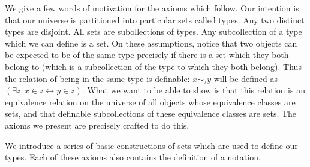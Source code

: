 \documentclass[12pt]{book}
\begin{document}
We give a few words of motivation for the axioms which follow.  Our intention is that our universe is partitioned into particular sets called types.  Any two distinct types are disjoint.  All sets are subollections of types.  Any subcollection of a type which we can define is a set.  On these assumptions, notice that two objects can be expected to be of the same type precisely if there is a set which they both belong to (which is a subcollection of the type to which they both belong).   Thus the relation of being in the same type is definable: $x \sim_{\tau} y$ will be defined as $(\exists z:x \in z \leftrightarrow y \in z)$.  What we want to be able to show is that this relation is an equivalence relation on the universe of all objects whose equivalence classes are sets, and that definable subcollections of these equivalence classes are sets.  The axioms we present are precisely crafted to do this.

We introduce a series of basic constructions of sets which are used to define our types.  Each of these axioms also contains the definition of a notation.
\end{document}

